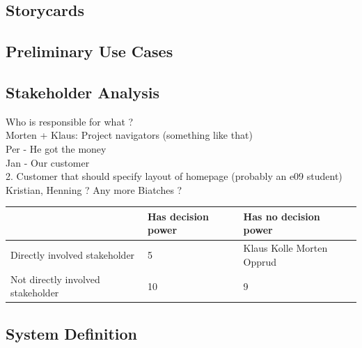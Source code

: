 \subsection{Storycards}

\subsection{Preliminary Use Cases}

\subsection{Stakeholder Analysis}
Who is responsible for what ?\\
Morten + Klaus: Project navigators (something like that)\\
Per - He got the money\\
Jan - Our customer\\
2. Customer that should specify layout of homepage (probably an e09 student)\\
Kristian, Henning ? Any more Biatches ?


\begin{table}
 \begin{center}
  \begin{tabular}{| l | l | l | }
   \hline
      & Has decision power & Has no decision power \\ \hline
    Directly involved stakeholder & 5 & Klaus Kolle Morten Opprud \\ \hline
    Not directly involved stakeholder & 10 & 9 \\
    \hline
  \end{tabular}
 \end{center}
\end{table}

\subsection{System Definition}

